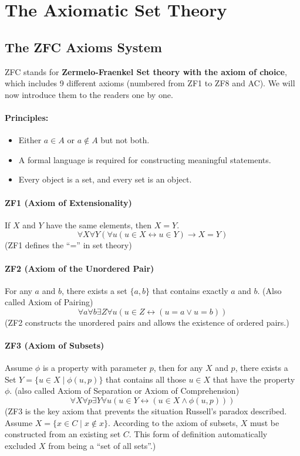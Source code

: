 \section{The Axiomatic Set Theory}

\subsection{The ZFC Axioms System}
ZFC stands for \textbf{Zermelo-Fraenkel Set theory with the axiom of choice}, which includes 9 different axioms (numbered from ZF1 to ZF8 and AC). We will now introduce them to the readers one by one.

\paragraph{Principles:}
\begin{itemize}
    \item Either $a \in A$ or $a \notin A$ but not both.
    \item A formal language is required for constructing meaningful statements.
    \item Every object is a set, and every set is an object.
\end{itemize}

\paragraph{ZF1 (Axiom of Extensionality)}
If $X$ and $Y$ have the same elements, then $X = Y$.
$$ \forall X \forall Y (\forall u (u \in X \leftrightarrow u \in Y) \to X = Y) $$
(ZF1 defines the “=” in set theory)

\paragraph{ZF2 (Axiom of the Unordered Pair)}
For any $a$ and $b$, there exists a set $\{a,b\}$ that contains exactly $a$ and $b$. (Also called Axiom of Pairing)
$$ \forall a \forall b \exists Z \forall u (u \in Z \leftrightarrow (u = a \vee u = b)) $$
(ZF2 constructs the unordered pairs and allows the existence of ordered pairs.)

\paragraph{ZF3 (Axiom of Subsets)}
Assume $\phi$ is a property with parameter $p$, then for any $X$ and $p$, there exists a Set $Y = \{u \in X \mid \phi(u, p)\}$ that contains all those $u \in X$ that have the property $\phi$. (also called Axiom of Separation or Axiom of Comprehension)
$$ \forall X \forall p \exists Y \forall u (u \in Y \leftrightarrow (u \in X \wedge \phi(u, p))) $$
(ZF3 is the key axiom that prevents the situation Russell’s paradox described. Assume $X = \{ x \in C \mid x \notin x \}$. According to the axiom of subsets, $X$ must be constructed from an existing set $C$. This form of definition automatically excluded $X$ from being a “set of all sets”.)

